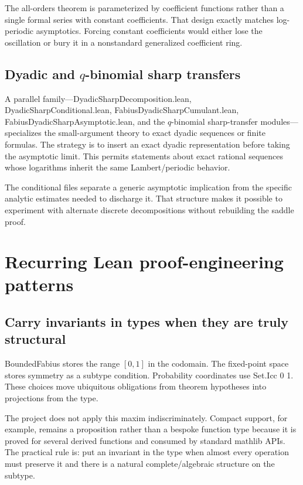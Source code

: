 \documentclass[11pt,a4paper,openany]{book}
\def\module#1{#1.lean}
\def\decl#1{#1}
\def\code#1{#1}
\newcommand{\module}[1]{\nolinkurl{#1.lean}}
\newcommand{\decl}[1]{\texttt{\detokenize{#1}}}
\newcommand{\code}[1]{\texttt{\detokenize{#1}}}
\begin{document}
\begin{engineering}
The all-orders theorem is parameterized by coefficient functions rather than a
single formal series with constant coefficients.  That design exactly matches
log-periodic asymptotics.  Forcing constant coefficients would either lose the
oscillation or bury it in a nonstandard generalized coefficient ring.
\end{engineering}

\section{Dyadic and \texorpdfstring{$q$-binomial}{q-binomial} sharp transfers}
A parallel family—\module{DyadicSharpDecomposition},
\module{DyadicSharpConditional}, \module{FabiusDyadicSharpCumulant},
\module{FabiusDyadicSharpAsymptotic}, and the $q$-binomial sharp-transfer
modules—specializes the small-argument theory to exact dyadic sequences or
finite formulas.  The strategy is to insert an exact dyadic representation
before taking the asymptotic limit.  This permits statements about exact
rational sequences whose logarithms inherit the same Lambert/periodic behavior.

The conditional files separate a generic asymptotic implication from the
specific analytic estimates needed to discharge it.  That structure makes it
possible to experiment with alternate discrete decompositions without
rebuilding the saddle proof.

\chapter{Recurring Lean proof-engineering patterns}
\label{ch:engineering}

\section{Carry invariants in types when they are truly structural}
\decl{BoundedFabius} stores the range $[0,1]$ in the codomain.  The fixed-point
space stores symmetry as a subtype condition.  Probability coordinates use
\code{Set.Icc 0 1}.  These choices move ubiquitous obligations from theorem
hypotheses into projections from the type.

The project does not apply this maxim indiscriminately.  Compact support, for
example, remains a proposition rather than a bespoke function type because it
is proved for several derived functions and consumed by standard mathlib APIs.
The practical rule is: put an invariant in the type when almost every operation
must preserve it and there is a natural complete/algebraic structure on the
subtype.
\end{document}
